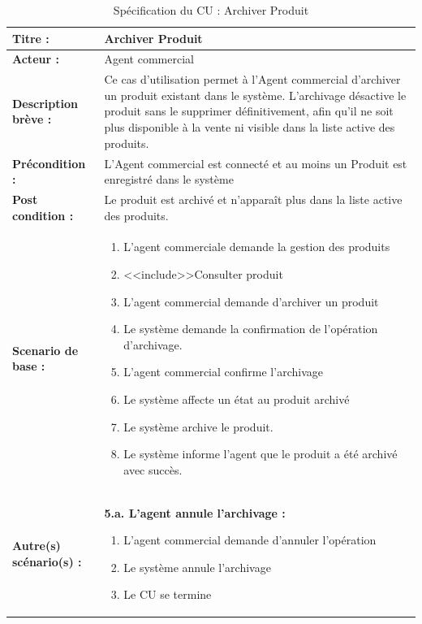 \begin{table}[H]
\begin{tabularx}{\textwidth}{|l|X|}
\hline
\textbf{Titre :} & Archiver Produit \\
\hline
\textbf{Acteur :} & Agent commercial \\
\hline
\textbf{Description brève :} & Ce cas d'utilisation permet à l'Agent commercial d'archiver un produit existant dans le système. L'archivage désactive le produit sans le supprimer définitivement, afin qu'il ne soit plus disponible à la vente ni visible dans la liste active des produits. \\
\hline
\textbf{Précondition :} & L'Agent commercial est connecté et au moins un Produit est enregistré dans le système \\
\hline
\textbf{Post condition :} & Le produit est archivé et n'apparaît plus dans la liste active des produits. \\
\hline
\textbf{Scenario de base :} &
\begin{enumerate}[leftmargin=1.5em, topsep=2pt, itemsep=1pt]
  \item L'agent commerciale demande la gestion des produits
  \item <<include>>Consulter produit
  \item L'agent commercial demande d'archiver un produit
  \item Le système demande la confirmation de l'opération d'archivage.
  \item L'agent commercial confirme l'archivage
  \item Le système affecte un état au produit archivé
  \item Le système archive le produit.
  \item Le système informe l'agent que le produit a été archivé avec succès.
\end{enumerate} \\
\hline
\textbf{Autre(s) scénario(s) :} &
\textbf{5.a. L'agent annule l'archivage :}
\begin{enumerate}[leftmargin=1.5em, topsep=2pt, itemsep=1pt]
  \item L'agent commercial demande d'annuler l'opération
  \item Le système annule l'archivage
  \item Le CU se termine
\end{enumerate} \\
\hline
\end{tabularx}
\caption{Spécification du CU : Archiver Produit}
\label{tab:cu-archiver-produit}
\end{table}

